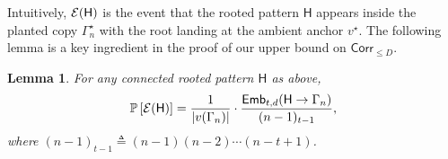 \documentclass[12pt]{article}
\newtheorem{lemma}{Lemma}
\newcommand {\pr} {\mathbb{P}}
\newcommand{\calE}{{\cal E}}
\newcommand{\pp}[1]{\left[#1\right]}
\newcommand{\s}[1]{\mathsf{#1}}
\begin{document}
Intuitively, $\calE(\s{H})$ is the event that the rooted pattern $\s{H}$ appears inside the planted copy $\Gamma_n^\star$ with the root landing at the ambient anchor $v^\star$. The following lemma is a key ingredient in the proof of our upper bound on $\s{Corr}_{\leq D}$.
\begin{lemma}\label{lem:probEmbedding}
For any connected rooted pattern $\s{H}$ as above,
\begin{align}
\pr\pp{\calE(\s{H})}
=
\frac{1}{|v(\Gamma_n)|}\cdot \frac{\s{Emb}_{t,d}(\s{H}\to\Gamma_n)}{(n-1)_{t-1}},
\end{align}
where $(n-1)_{t-1}\triangleq(n-1)(n-2)\cdots(n-t+1)$.
\end{lemma}
\end{document}

